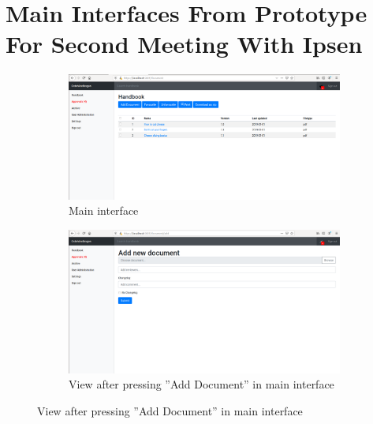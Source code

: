 \newpage
\section{Main Interfaces From Prototype For Second Meeting With Ipsen}\label{sec:1prototype}
\begin{figure}[H]
	\centering
	\begin{subfigure}[b]{0.48\textwidth}
		\includegraphics[width=\textwidth]{billeder/iteration1Prototyper/Handbook.png}
		\caption{Main interface}
		\label{fig:3-main}
	\end{subfigure}
	\quad
	\begin{subfigure}[b]{0.48\textwidth}
		\includegraphics[width=\textwidth]{billeder/iteration1Prototyper/Add-Document.png}
		\caption{View after pressing ''Add Document'' in main interface}
		\label{fig:3-addDoc}
	\end{subfigure}
\end{figure}
